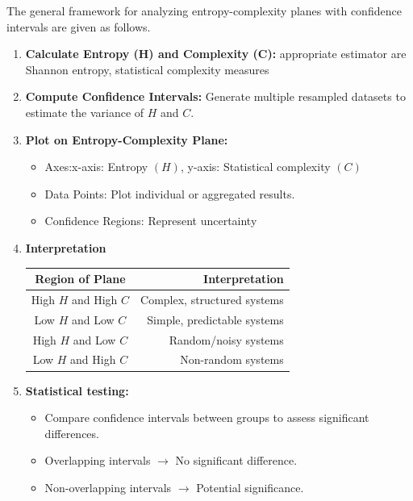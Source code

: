 The general framework for analyzing entropy-complexity planes with confidence intervals are given as follows.
\begin{enumerate}
\item \textbf{Calculate Entropy (H) and Complexity (C):} 
appropriate estimator are Shannon entropy, statistical complexity measures 
\item \textbf{Compute Confidence Intervals:}
Generate multiple resampled datasets to estimate the variance of $H$ and $C$.
\item \textbf{Plot on Entropy-Complexity Plane:}
\begin{itemize}
	\item Axes:x-axis: Entropy $(H)$, y-axis: Statistical complexity $(C)$
	\item Data Points: Plot individual or aggregated results.
	\item Confidence Regions: Represent uncertainty 
\end{itemize}

\item \textbf{Interpretation}
\begin{table}[H]
	\centering
	\begin{tabular}{cr}
		\toprule
		Region of Plane  & Interpretation  \\
		\midrule
		High $H$ and High $C$ & Complex, structured systems \\ 
		Low $H$ and Low $C$ & Simple, predictable systems \\
		High $H$ and Low $C$ & Random/noisy systems \\
		Low $H$ and High $C$ & Non-random systems \\ 
		\bottomrule
	\end{tabular}
	\end{table}

\item \textbf{Statistical testing:}
\begin{itemize}
	\item Compare confidence intervals between groups to assess significant differences.
	\item Overlapping intervals $\rightarrow$ {No significant difference}.
	\item Non-overlapping intervals $\rightarrow$ Potential significance.
\end{itemize}
\end{enumerate}



    



